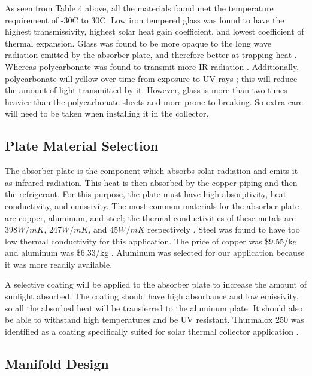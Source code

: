 \medskip
As seen from Table 4 above, all the materials found met the temperature requirement of -30\textdegree C to 30\textdegree C. Low iron tempered glass was found to have the highest transmissivity, highest solar heat gain coefficient, and lowest coefficient of thermal expansion. Glass was found to be more opaque to the long wave radiation emitted by the absorber plate, and therefore better at trapping heat \cite{low_iron_glass_vs_regular}. Whereas polycarbonate was found to transmit more IR radiation \cite{plexiglass}. Additionally, polycarbonate will yellow over time from exposure to UV rays \cite{polycarbonate_yellowing}; this will reduce the amount of light transmitted by it. However, glass is more than two times heavier than the polycarbonate sheets and more prone to breaking. So extra care will need to be taken when installing it in the collector.

\subsection{Plate Material Selection}

The absorber plate is the component which absorbs solar radiation and emits it as infrared radiation. This heat is then absorbed by the copper piping and then the refrigerant. For this purpose, the plate must have high absorptivity, heat conductivity, and emissivity. The most common materials for the absorber plate are copper, aluminum, and steel; the thermal conductivities of these metals are $398 W/mK$, $247 W/mK$, and $45 W/mK$ respectively \cite{thermally_conductive_materials} \cite{thermal_conductivity_of_steel}. Steel was found to have too low thermal conductivity for this application. The price of copper was \$9.55/kg \cite{copper_prices} and aluminum was \$6.33/kg \cite{aluminum_prices}. Aluminum was selected for our application because it was more readily available.

\medskip
A selective coating will be applied to the absorber plate to increase the amount of sunlight absorbed. The coating should have high absorbance and low emissivity, so all the absorbed heat will be transferred to the aluminum plate. It should also be able to withstand high temperatures and be UV resistant. Thurmalox 250 was identified as a coating specifically suited for solar thermal collector application \cite{high_temp_coating}.

\subsection{Manifold Design}

